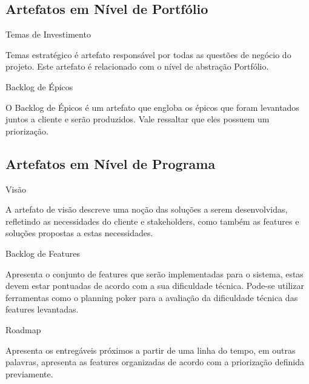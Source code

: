 \begin{itemize}
{}

{\large{\subsection{Artefatos em Nível de Portfólio }}}

{
	\large{\item Temas de Investimento \\}

	\tab Temas estratégico é artefato responsável por todas as questões de negócio do projeto. Este artefato é relacionado com o nível de abstração Portfólio. \\
}


{
	\large{\item Backlog de  Épicos \\}

	\tab O Backlog de Épicos é um artefato que engloba os épicos que foram levantados juntos a cliente e serão produzidos. Vale ressaltar que eles possuem um priorização. \\
}

{\large{\subsection {Artefatos em Nível de Programa }}}

{
	\large{\item Visão \\}

	\tab A artefato de visão descreve uma noção das soluções a serem desenvolvidas, refletindo as necessidades do cliente e stakeholders, como também as features e soluções propostas a estas necessidades. \\
}


{
	\large{\item Backlog de Features \\}

	\tab Apresenta o conjunto de features que serão implementadas para o sistema, estas devem estar pontuadas de acordo com a sua dificuldade técnica. Pode-se utilizar ferramentas como o planning poker para a avaliação da dificuldade técnica das features levantadas. \\
}

{
	\large{\item Roadmap \\}

	\tab Apresenta os entregáveis próximos a partir de uma linha do tempo, em outras palavras, apresenta as features organizadas de acordo com a priorização definida previamente. \\
}


\end{itemize}
